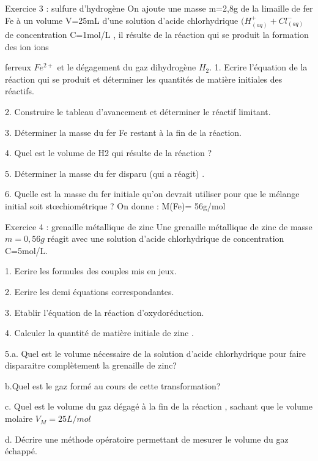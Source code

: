 \documentclass[12pt, french]{article}
\begin{document}
\begin{Box2}{Exercice 3 :  sulfure d’hydrogène }
On ajoute une masse m=2,8g de la limaille de fer Fe à un volume V=25mL d’une solution d’acide chlorhydrique
$(H^+_{(aq)} + Cl^-_{(aq)} $ de concentration C=1mol/L , il résulte de la réaction qui se produit la formation des ion ions

   ferreux $Fe^{2+}$ et le dégagement du gaz dihydrogène $H_2$.
1. Ecrire l’équation de la réaction qui se produit et déterminer les quantités de matière initiales des réactifs.

   2. Construire le tableau d’avancement et déterminer le réactif limitant.

   3. Déterminer la masse du fer Fe restant à la fin de la réaction.

   4. Quel est le volume de H2 qui résulte de la réaction ?

   5. Déterminer la masse du fer disparu (qui a réagit) .

   6. Quelle est la masse du fer initiale qu’on devrait utiliser pour que le mélange initial soit stœchiométrique ?
On donne : M(Fe)= 56g/mol

\end{Box2}

\begin{Box2}{Exercice 4 : grenaille métallique de zinc }
Une grenaille métallique de zinc de masse $m=0,56g$ réagit avec une solution d'acide chlorhydrique de
concentration C=5mol/L.

1. Ecrire les formules des couples mis en jeux.

   2. Ecrire les demi équations correspondantes.

   3. Etablir l'équation de la réaction d'oxydoréduction.

   4. Calculer la quantité de matière initiale de zinc .

   5.a. Quel est le volume nécessaire de la solution d'acide chlorhydrique pour faire disparaitre complètement la
grenaille de zinc?

   b.Quel est le gaz formé au cours de cette transformation?

   c. Quel est le volume du gaz dégagé à la fin de la réaction , sachant que le volume molaire $V_M=25L/mol$

   d. Décrire une méthode opératoire permettant de mesurer le volume du gaz échappé.  

\end{Box2}
\end{document}
